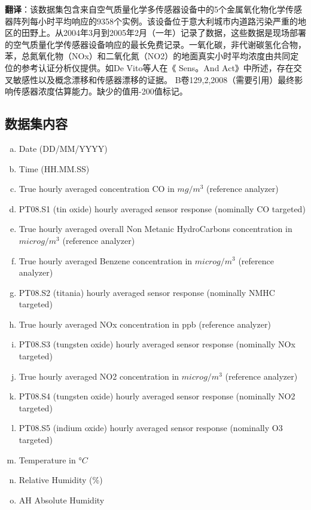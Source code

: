 \documentclass{ctexart}
\begin{document}
\textbf{翻译}：该数据集包含来自空气质量化学多传感器设备中的5个金属氧化物化学传感器阵列每小时平均响应的9358个实例。该设备位于意大利城市内道路污染严重的地区的田野上。从2004年3月到2005年2月（一年）记录了数据，这些数据是现场部署的空气质量化学传感器设备响应的最长免费记录。一氧化碳，非代谢碳氢化合物，苯，总氮氧化物（NOx）和二氧化氮（NO2）的地面真实小时平均浓度由共同定位的参考认证分析仪提供。如De Vito等人在《 Sens。And Act》中所述，存在交叉敏感性以及概念漂移和传感器漂移的证据。 B卷129,2,2008（需要引用）最终影响传感器浓度估算能力。缺少的值用-200值标记。

	

\subsection{数据集内容}
\begin{enumerate}[(a)]
	\item Date (DD/MM/YYYY)
	\item Time (HH.MM.SS)
	\item True hourly averaged concentration CO in $mg/m^3$ (reference analyzer)
	\item PT08.S1 (tin oxide) hourly averaged sensor response (nominally CO targeted)
	\item True hourly averaged overall Non Metanic HydroCarbons concentration in $microg/m^3$ (reference analyzer)
	\item True hourly averaged Benzene concentration in $microg/m^3$ (reference analyzer)
	\item  PT08.S2 (titania) hourly averaged sensor response (nominally NMHC targeted)
	\item True hourly averaged NOx concentration in ppb (reference analyzer)
	\item PT08.S3 (tungsten oxide) hourly averaged sensor response (nominally NOx targeted)
	\item True hourly averaged NO2 concentration in $microg/m^3$ (reference analyzer)
	\item PT08.S4 (tungsten oxide) hourly averaged sensor response (nominally NO2 targeted)
	\item PT08.S5 (indium oxide) hourly averaged sensor response (nominally O3 targeted)
	\item Temperature in $°C$
	\item Relative Humidity (\%)
	\item AH Absolute Humidity 
\end{enumerate}
\end{document}
